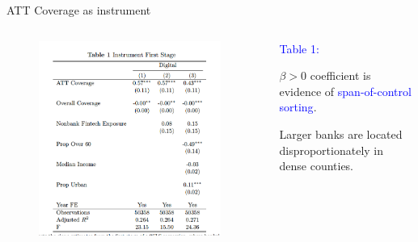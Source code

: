 \documentclass[notes,10pt, aspectratio=169]{beamer}
\newenvironment{wideitemize}{\itemize\addtolength{\itemsep}{10pt}}{\enditemize}
\begin{document}
\begin{frame}{ATT Coverage as instrument}



\begin{columns}[T]
    
    \begin{column}{0.5\textwidth}
    
    \begin{figure}
        \centering
        \includegraphics[width=0.95\textwidth]{imgs/tab1.png}
        \label{fig:my_label}
    \end{figure}

\end{column}
\begin{column}{0.5\textwidth}
    

    \begin{wideitemize}
        \item \textcolor{blue}{Table 1:} 
        \begin{wideitemize}
            \item $\beta>0$ coefficient is evidence of \textcolor{blue}{span-of-control sorting}.
            \item Larger banks are located disproportionately in dense counties.
        \end{wideitemize}
    \end{wideitemize}
\end{column}
\end{columns}


\end{frame}
\end{document}
